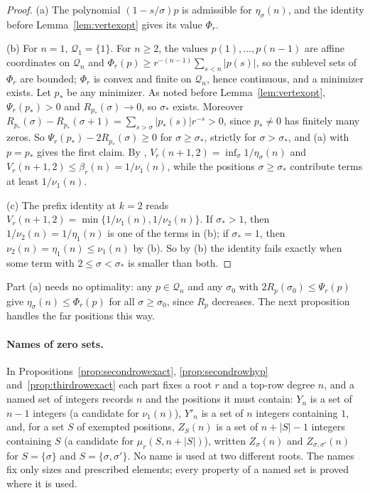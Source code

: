 \documentclass[11pt]{article}
\begin{document}
\begin{proof}
(a) The polynomial $(1-s/\sigma)p$ is admissible for $\eta_\sigma(n)$, and
the identity before Lemma~\ref{lem:vertexopt} gives its value $\Phi_r$.

(b) For $n=1$, $\mathcal Q_1=\{1\}$.  For $n\ge2$, the values
$p(1),\ldots,p(n-1)$ are affine coordinates on $\mathcal Q_n$ and
$\Phi_r(p)\ge r^{-(n-1)}\sum_{s<n}|p(s)|$, so the sublevel sets of $\Phi_r$ are
bounded; $\Phi_r$ is convex and finite on $\mathcal Q_n$, hence continuous,
and a minimizer exists.  Let $p_*$ be any minimizer.  As noted before
Lemma~\ref{lem:vertexopt}, $\Psi_r(p_*)>0$ and $R_{p_*}(\sigma)\to0$, so $\sigma_*$ exists.  Moreover
$R_{p_*}(\sigma)-R_{p_*}(\sigma+1)=\sum_{s>\sigma}|p_*(s)|r^{-s}>0$, since
$p_*\ne0$ has finitely many zeros.  So $\Psi_r(p_*)-2R_{p_*}(\sigma)\ge0$ for
$\sigma\ge\sigma_*$, strictly for $\sigma>\sigma_*$, and (a) with $p=p_*$
gives the first claim.  By \cite[Proposition~2.1(b) and (c)]{coefficient-mass-rows},
$V_r(n+1,2)=\inf_\sigma1/\eta_\sigma(n)$ and
$V_r(n+1,2)\le\beta_r(n)=1/\nu_1(n)$, while the positions
$\sigma\ge\sigma_*$ contribute terms at least $1/\nu_1(n)$.

(c) The prefix identity at $k=2$ reads
$V_r(n+1,2)=\min\{1/\nu_1(n),1/\nu_2(n)\}$.  If $\sigma_*>1$, then
$1/\nu_2(n)=1/\eta_1(n)$ is one of the terms in (b); if $\sigma_*=1$, then
$\nu_2(n)=\eta_1(n)\le\nu_1(n)$ by (b).  So by (b) the identity fails
exactly when some term with $2\le\sigma<\sigma_*$ is smaller than both.
\end{proof}

Part (a) needs no optimality: any $p\in\mathcal Q_n$ and any $\sigma_0$
with $2R_p(\sigma_0)\le\Psi_r(p)$ give $\eta_\sigma(n)\le\Phi_r(p)$ for all
$\sigma\ge\sigma_0$, since $R_p$ decreases.  The next proposition handles
the far positions this way.

\paragraph{Names of zero sets.}
In Propositions~\ref{prop:secondrowexact}, \ref{prop:secondrowhyp}
and~\ref{prop:thirdrowexact} each part fixes a root $r$ and a top-row degree $n$, and a named set of integers
records $n$ and the positions it must contain: $Y_n$ is a set of $n-1$
integers (a candidate for $\nu_1(n)$), $Y'_n$ is a set of $n$ integers
containing $1$, and, for a set $S$ of exempted positions, $Z_S(n)$ is a set
of $n+|S|-1$ integers containing $S$ (a candidate for $\mu_r(S,n+|S|)$),
written $Z_\sigma(n)$ and $Z_{\sigma,\sigma'}(n)$ for $S=\{\sigma\}$ and
$S=\{\sigma,\sigma'\}$.  No name is used at two different roots.  The names
fix only sizes and prescribed elements; every property of a named set is
proved where it is used.
\end{document}
